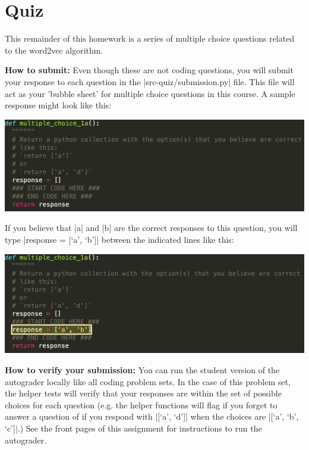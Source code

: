 \section{Quiz}

This remainder of this homework is a series of multiple choice questions related to the word2vec algorithm.

{\bf How to submit:}  Even though these are not coding questions, you will submit your response to
each question in the |src-quiz/submission.py| file.  This file will act as
your 'bubble sheet' for multiple choice questions in this course.  A sample response
might look like this:

\begin{center}
\includegraphics[width=1\textwidth]{sample_question_empty.png}
\end{center}

If you believe that |a| and |b| are the correct responses to this question, you
will type |response = [`a', `b']| between the indicated lines like this:

\begin{center}
\includegraphics[width=1\textwidth]{sample_question_complete.png}
\end{center}

{\bf How to verify your submission:}
You can run the student version of the autograder locally like all coding
problem sets.  In the case of this problem set, the helper tests will verify
that your responses are within the set of possible choices for each question
(e.g. the helper functions will flag if you forget to answer a question of if
you respond with |[`a', `d']| when the choices are |[`a', `b', `c']|.)  See the
front pages of this assignment for instructions to run the autograder.
\clearpage

